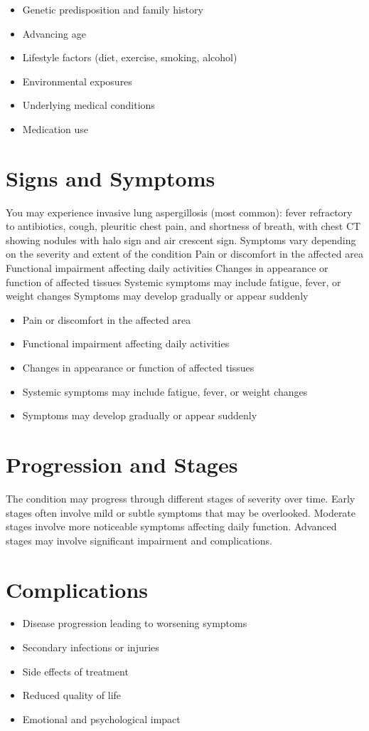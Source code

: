 \begin{itemize}[noitemsep]
  \item Genetic predisposition and family history
  \item Advancing age
  \item Lifestyle factors (diet, exercise, smoking, alcohol)
  \item Environmental exposures
  \item Underlying medical conditions
  \item Medication use
\end{itemize}
\section{Signs and Symptoms}
You may experience invasive lung aspergillosis (most common): fever refractory to antibiotics, cough, pleuritic chest pain, and shortness of breath, with chest CT showing nodules with halo sign and air crescent sign. Symptoms vary depending on the severity and extent of the condition Pain or discomfort in the affected area Functional impairment affecting daily activities Changes in appearance or function of affected tissues Systemic symptoms may include fatigue, fever, or weight changes Symptoms may develop gradually or appear suddenly

\begin{itemize}[noitemsep]
  \item Pain or discomfort in the affected area
  \item Functional impairment affecting daily activities
  \item Changes in appearance or function of affected tissues
  \item Systemic symptoms may include fatigue, fever, or weight changes
  \item Symptoms may develop gradually or appear suddenly
\end{itemize}
\section{Progression and Stages}
The condition may progress through different stages of severity over time. Early stages often involve mild or subtle symptoms that may be overlooked. Moderate stages involve more noticeable symptoms affecting daily function. Advanced stages may involve significant impairment and complications.
\section{Complications}
\begin{itemize}[noitemsep]
  \item Disease progression leading to worsening symptoms
  \item Secondary infections or injuries
  \item Side effects of treatment
  \item Reduced quality of life
  \item Emotional and psychological impact
\end{itemize}
